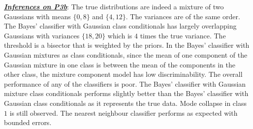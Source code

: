 \documentclass[12pt, a4 paper]{article}
\begin{document}
\underline {\it \bfseries Inferences on P3b}: The true distributions are indeed a mixture of two Gaussians with means $\{0,8\}$ and $\{4,12\}$. The variances are of the same order. The Bayes' classifier with Gaussian class conditionals has largely overlapping Gaussians with variances $\{18, 20\}$ which is $4$ times the true variance. The threshold is a bisector that is weighted by the priors. In the Bayes' classifier with Gaussian mixtures as class conditionals, since the mean of one component of the Gaussian mixture in one class is between the mean of the components in the other class, the mixture component model has low discriminability. The overall performance of any of the classifiers is poor. The Bayes' classifier with Gaussian mixture class conditionals performs slightly better than the Bayes' classifier with Gaussian class conditionals as it represents the true data. Mode collapse in class $1$ is still observed. The nearest neighbour classifier performs as expected with bounded errors. \\
\end{document}
